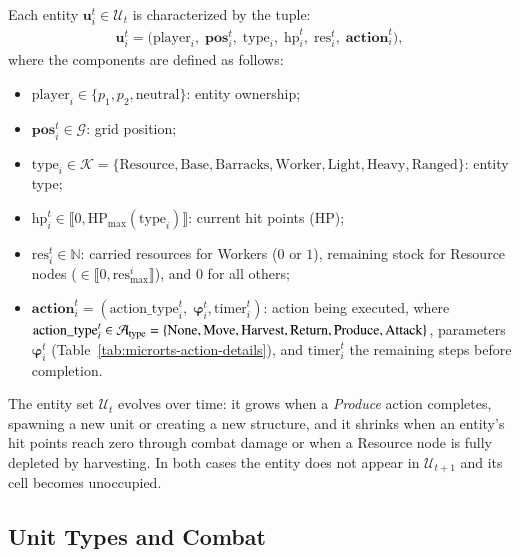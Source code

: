 Each entity $\mathbf{u}^{t}_i \in \mathcal{U}_t$ is characterized by the tuple:
\begin{align}
\mathbf{u}^{t}_i = 
\bigl(
    \mathrm{player}_i,\; \mathbf{pos}^{t}_i,\; 
    \mathrm{type}_i,\; 
    \mathrm{hp}^{t}_i,\; \mathrm{res}^{t}_i,\; \mathbf{action}^{t}_i
\bigr),
\end{align}
where the components are defined as follows:
\begin{itemize}
    \item $\mathrm{player}_i \in \{p_1, p_2, \text{neutral}\}$: entity ownership;
    \item $\mathbf{pos}^{t}_i \in \mathcal{G}$: grid position;
    \item $\mathrm{type}_i \in \mathcal{K} = \{\text{Resource}, \text{Base}, \text{Barracks}, \text{Worker}, \text{Light}, \text{Heavy}, \text{Ranged}\}$: entity type;
    \item $\mathrm{hp}^{t}_i \in \llbracket 0, \mathrm{HP}_{\max}(\mathrm{type}_i) \rrbracket$: current hit points (HP);
    \item $\mathrm{res}^{t}_i \in \mathbb{N}$: carried resources for Workers ($0$ or $1$), remaining stock for Resource nodes ($\in \llbracket 0, \mathrm{res}_{\max}^{i} \rrbracket$), and $0$ for all others;
    \item $\mathbf{action}^{t}_i = (\mathrm{action\_type}^{t}_i,\; \boldsymbol{\varphi}^{t}_i, \mathrm{timer}^{t}_i)$: action being executed, where $\mathrm{action\_type}^{t}_i \in \mathcal{A}_{\text{type}} = \\ \{\text{None}, \text{Move}, \text{Harvest}, \text{Return}, \text{Produce}, \text{Attack}\}$, parameters $\boldsymbol{\varphi}^{t}_i$ (Table~\ref{tab:microrts-action-details}), and $\mathrm{timer}^{t}_i$ the remaining steps before completion.
\end{itemize}

The entity set $\mathcal{U}_t$ evolves over time: it grows when a \emph{Produce} action completes, spawning a new unit or creating a new structure, and it shrinks when an entity's hit points reach zero through combat damage or when a Resource node is fully depleted by harvesting. In both cases the entity does not appear in $\mathcal{U}_{t+1}$ and its cell becomes unoccupied.

\subsection{Unit Types and Combat}
\label{sec:microrts-units}

